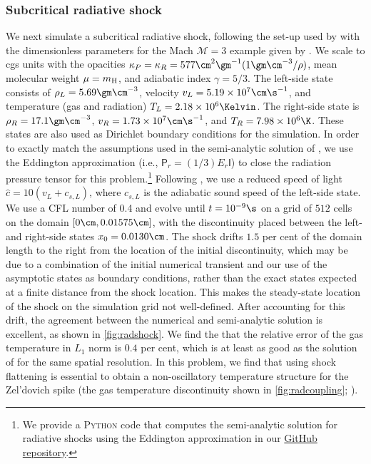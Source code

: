 \documentclass[fleqn,usenatbib]{mnras}
\begin{document}
\subsubsection{Subcritical radiative shock}
\label{section:radshock}
We next simulate a subcritical radiative shock, following the set-up used by \cite{Skinner_2019} with the dimensionless parameters for the Mach $\mathcal{M} = 3$ example given by \cite{Lowrie_2008}. We scale to cgs units with the opacities $\kappa_P = \kappa_R = 577 \cm^{2} \gm^{-1} (1 \gm \cm^{-3} / \rho)$, mean molecular weight $\mu = m_{\rm H}$, and adiabatic index $\gamma = 5/3$. The left-side state consists of $\rho_L = 5.69 \gm \cm^{-3}$, velocity $v_L = 5.19 \times 10^7 \cm \s^{-1}$, and temperature (gas and radiation) $T_L = 2.18 \times 10^6 \Kelvin$. The right-side state is $\rho_R = 17.1 \gm \cm^{-3}$, $v_R = 1.73 \times 10^7 \cm \s^{-1}$, and $T_R = 7.98 \times 10^6 \K$. These states are also used as Dirichlet boundary conditions for the simulation. In order to exactly match the assumptions used in the semi-analytic solution of \cite{Lowrie_2008}, we use the Eddington approximation (i.e., $\textsf{P}_r = (1/3) E_r \textsf{I}$) to close the radiation pressure tensor for this problem.\footnote{We provide a \textsc{Python} code that computes the semi-analytic solution for radiative shocks using the Eddington approximation \citep{Lowrie_2008} in our \faGithub\href{https://github.com/BenWibking/quokka-code}{GitHub repository}.} Following \cite{Skinner_2019}, we use a reduced speed of light $\hat c = 10(v_L + c_{s,L})$, where $c_{s,L}$ is the adiabatic sound speed of the left-side state.  We use a CFL number of 0.4 and evolve until $t = 10^{-9} \s$ on a grid of $512$ cells on the domain $[0 \cm, 0.01575 \cm]$, with the discontinuity placed between the left- and right-side states $x_0 = 0.0130 \cm$. The shock drifts $1.5$ per cent of the domain length to the right from the location of the initial discontinuity, which may be due to a combination of the initial numerical transient and our use of the asymptotic states as boundary conditions, rather than the exact states expected at a finite distance from the shock location. This makes the steady-state location of the shock on the simulation grid not well-defined. After accounting for this drift, the agreement between the numerical and semi-analytic solution is excellent, as shown in \autoref{fig:radshock}. We find the that the relative error of the gas temperature in $L_1$ norm is $0.4$ per cent, which is at least as good as the solution of \cite{Skinner_2019} for the same spatial resolution.  In this problem, we find that using shock flattening is essential to obtain a non-oscillatory temperature structure for the Zel'dovich spike (the gas temperature discontinuity shown in \autoref{fig:radcoupling}; \citealt{Zeldovich_1967}).
\end{document}
